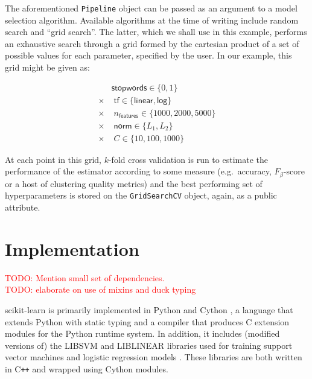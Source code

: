 \documentclass{llncs}
\begin{document}
The aforementioned \texttt{Pipeline} object
can be passed as an argument to a model selection algorithm.
Available algorithms at the time of writing include random search
\citep{bergstra2012} and ``grid search''.
The latter, which we shall use in this example,
performs an exhaustive search through a grid formed by the cartesian product
of a set of possible values for each parameter, specified by the user.
In our example, this grid might be given as:

\begin{align*}
         & \textsf{stopwords} \in \{0, 1\}                      \\
  \times & \; \textsf{tf} \in \{\textsf{linear}, \textsf{log}\} \\
  \times & \; n_\textsf{features} \in \{1000, 2000, 5000\}      \\
  \times & \; \textsf{norm} \in \{L_1, L_2\}                    \\
  \times & \; C \in \{10, 100, 1000\}
\end{align*}

At each point in this grid, $k$-fold cross validation is run
to estimate the performance of the estimator according to some measure
(e.g.\ accuracy, $F_\beta$-score or a host of clustering quality metrics)
and the best performing set of hyperparameters is stored
on the \texttt{GridSearchCV} object, again, as a public attribute.

\section{Implementation}

\label{sec:implementation}

\noindent \textcolor{red}{TODO: Mention small set of dependencies.}\\
\textcolor{red}{TODO: elaborate on use of mixins and duck typing}

scikit-learn is primarily implemented in Python and Cython
\citep{behnel2011cython},
a language that extends Python with static typing
and a compiler that produces C extension modules
for the Python runtime system.
In addition, it includes (modified versions of)
the \textsf{LIBSVM} and \textsf{LIBLINEAR} libraries
used for training support vector machines
and logistic regression models \citep{chang2011libsvm, fan2008}.
These libraries are both written in C{}\verb!++!
and wrapped using Cython modules.
\end{document}
